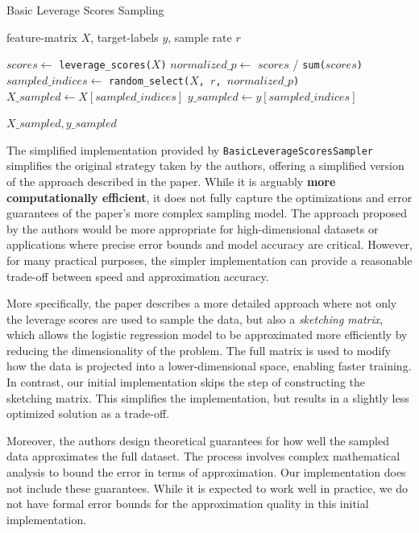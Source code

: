 \documentclass{article}
\theoremstyle{plain}
\theoremstyle{definition}
\theoremstyle{remark}
\begin{document}
\begin{algorithm}[tb]
	\caption{Basic Leverage Scores Sampling}
	\label{alg:example}
	\begin{algorithmic}
		 feature-matrix $X$, target-labels $y$, sample rate $r$
		
		\vspace{0.25cm}
		
		\STATE $scores \leftarrow$ \texttt{leverage\_scores($X$)}
		\STATE $normalized\_p \leftarrow$ $scores$ / \texttt{sum($scores$)}
		\STATE $sampled\_indices \leftarrow$ \texttt{random\_select($X$, $r$,  $normalized\_p$)}
		\STATE $X\_sampled \leftarrow X[sampled\_indices]$
		\STATE $y\_sampled \leftarrow y[sampled\_indices]$
		
		\vspace{0.25cm}
		
		 \texttt{$X\_sampled, y\_sampled$}
	\end{algorithmic}
\end{algorithm}


The simplified implementation provided by \texttt{BasicLeverageScoresSampler} simplifies the original strategy taken by the authors, offering a simplified version of the approach described in the paper. While it is arguably \textbf{more computationally efficient}, it does not fully capture the optimizations and error guarantees of the paper's more complex sampling model. The approach proposed by the authors would be more appropriate for high-dimensional datasets or applications where precise error bounds and model accuracy are critical. However, for many practical purposes, the simpler implementation can provide a reasonable trade-off between speed and approximation accuracy.

More specifically, the paper describes a more detailed approach where not only the leverage scores are used to sample the data, but also a \textit{sketching matrix}, which allows the logistic regression model to be approximated more efficiently by reducing the dimensionality of the problem. The full matrix is used to modify how the data is projected into a lower-dimensional space, enabling faster training. In contrast, our initial implementation skips the step of constructing the sketching matrix. This simplifies the implementation, but results in a slightly less optimized solution as a trade-off.

Moreover, the authors design theoretical guarantees for how well the sampled data approximates the full dataset. The process involves complex mathematical analysis to bound the error in terms of approximation. Our implementation does not include these guarantees. While it is expected to work well in practice, we do not have formal error bounds for the approximation quality in this initial implementation.
\end{document}
